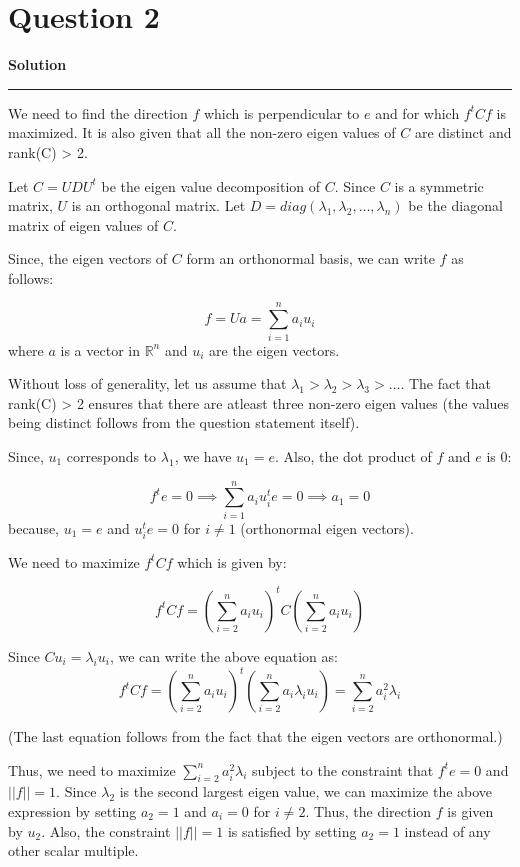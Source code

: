 \documentclass[a4paper,12pt]{article}
\title{\cooltitle{CS663 Assignment-4}}
\author{{\bf Saksham Rathi, Kavya Gupta, Shravan Srinivasa Raghavan} \\
\small Department of Computer Science, \\
Indian Institute of Technology Bombay \\}
\date{}
\newenvironment{solution}[2][]{%
    \begin{mdframed}[linecolor=blue!70!black, linewidth=2pt, roundcorner=10pt, backgroundcolor=yellow!10!white, skipabove=12pt, skipbelow=12pt]%
        \textbf{\large #2}
        \par\noindent\rule{\textwidth}{0.4pt}
}{
    \end{mdframed}
}
\begin{document}
\maketitle

\section*{Question 2}

\begin{solution}{Solution}
We need to find the direction $f$ which is perpendicular to $e$ and for which $f^tCf$ is maximized. It is also given that all the non-zero eigen values of $C$ are distinct and rank(C) > 2. 

Let $C = UDU^t$ be the eigen value decomposition of $C$. Since $C$ is a symmetric matrix, $U$ is an orthogonal matrix. Let $D = diag(\lambda_1, \lambda_2, \ldots, \lambda_n)$ be the diagonal matrix of eigen values of $C$.


Since, the eigen vectors of $C$ form an orthonormal basis, we can write $f$ as follows:

\begin{equation}
    f = Ua = \sum_{i=1}^{n} a_iu_i
\end{equation}
where $a$ is a vector in $\mathbb{R}^n$ and $u_i$ are the eigen vectors.

Without loss of generality, let us assume that $\lambda_1 > \lambda_2 > \lambda_3 > \dots$. The fact that rank(C) > 2 ensures that there are atleast three non-zero eigen values (the values being distinct follows from the question statement itself).

Since, $u_1$ corresponds to $\lambda_1$, we have $u_1 = e$. Also, the dot product of $f$ and $e$ is 0:

\begin{equation}
  f^te = 0 \implies \sum_{i=1}^{n} a_iu_i^te = 0 \implies a_1 = 0
\end{equation}
because, $u_1 = e$ and $u_i^te = 0$ for $i \neq 1$ (orthonormal eigen vectors).

We need to maximize $f^tCf$ which is given by:

\begin{equation}
  f^tCf = (\sum_{i=2}^n a_iu_i)^t C(\sum_{i=2}^n a_iu_i)
\end{equation}

Since $Cu_i = \lambda_i u_i$, we can write the above equation as:
\begin{equation}
  f^tCf = (\sum_{i=2}^n a_iu_i)^t (\sum_{i=2}^n a_i\lambda_iu_i) = \sum_{i=2}^n a_i^2\lambda_i
\end{equation}

(The last equation follows from the fact that the eigen vectors are orthonormal.)

Thus, we need to maximize $\sum_{i=2}^n a_i^2\lambda_i$ subject to the constraint that $f^te = 0$ and $||f|| = 1$. Since $\lambda_2$ is the second largest eigen value, we can maximize the above expression by setting $a_2 = 1$ and $a_i = 0$ for $i \neq 2$. Thus, the direction $f$ is given by $u_2$. Also, the constraint $||f|| = 1$ is satisfied by setting $a_2 = 1$ instead of any other scalar multiple.
\end{solution}
\end{document}
